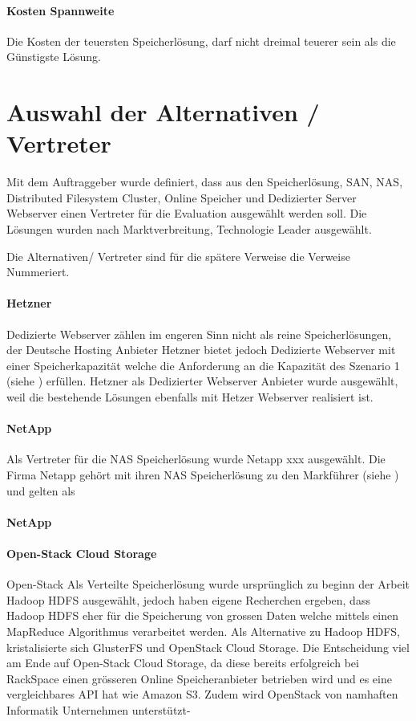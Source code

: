 \paragraph{Kosten Spannweite}\label{KO-2}
Die Kosten der teuersten Speicherlösung, darf nicht dreimal teuerer sein als die Günstigste Lösung.

\section{Auswahl der Alternativen / Vertreter}
Mit dem Auftraggeber wurde definiert, dass aus den Speicherlösung, SAN, NAS, Distributed Filesystem Cluster, Online Speicher und   Dedizierter Server Webserver einen Vertreter für die Evaluation ausgewählt werden soll. Die Lösungen wurden nach Marktverbreitung, Technologie Leader ausgewählt.

Die Alternativen/ Vertreter sind für die spätere Verweise die Verweise Nummeriert.

\setcounter{paragraph}{0}
\renewcommand\theparagraph{Al-\arabic{paragraph}}
\paragraph{Hetzner}\label{Al-1}
Dedizierte Webserver zählen im engeren Sinn nicht als reine Speicherlösungen, der Deutsche Hosting Anbieter Hetzner bietet jedoch Dedizierte Webserver mit einer Speicherkapazität welche die Anforderung an die Kapazität des Szenario 1 (siehe ) erfüllen. Hetzner als Dedizierter Webserver Anbieter wurde ausgewählt, weil die bestehende Lösungen ebenfalls mit Hetzer Webserver realisiert ist. 

\paragraph{NetApp}\label{Al-2}
Als Vertreter für die NAS Speicherlösung wurde Netapp xxx ausgewählt. Die Firma Netapp gehört mit ihren NAS Speicherlösung zu den Markführer (siehe ) und gelten als 

\paragraph{NetApp}\label{Al-3}


\paragraph{Open-Stack Cloud Storage}\label{Al-4}
Open-Stack 
Als Verteilte Speicherlösung wurde ursprünglich zu beginn der Arbeit Hadoop HDFS ausgewählt, jedoch haben eigene Recherchen ergeben, dass Hadoop HDFS eher für die Speicherung von grossen Daten welche mittels einen MapReduce Algorithmus verarbeitet werden. Als Alternative zu Hadoop HDFS, kristalisierte sich GlusterFS und OpenStack Cloud Storage. Die Entscheidung viel am Ende auf Open-Stack Cloud Storage, da diese bereits erfolgreich bei RackSpace einen grösseren Online Speicheranbieter betrieben wird und es eine vergleichbares API hat wie Amazon S3. Zudem wird OpenStack von namhaften Informatik Unternehmen unterstützt-


